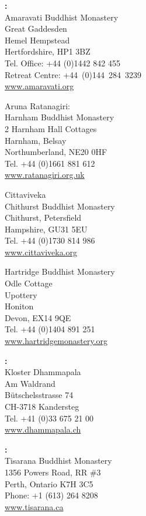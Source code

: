 {\raggedright

\textbf{\MakeUppercase{\xUnitedKingdom}:}\\
Amaravati Buddhist Monastery\\
Great Gaddesden\\
Hemel Hempstead\\
Hertfordshire, HP1 3BZ\\
Tel. Office: +44 (0)1442 842 455\\
Retreat Centre: \mbox{+44 (0)144 284 3239}\\
\href{http://www.amaravati.org}{www.amaravati.org}

Aruna Ratanagiri:\\
Harnham Buddhist Monastery\\
2 Harnham Hall Cottages\\
Harnham, Belsay\\
Northumberland, NE20 0HF\\
Tel. +44 (0)1661 881 612\\
\href{http://www.ratanagiri.org.uk}{www.ratanagiri.org.uk}

Cittaviveka\\
Chithurst Buddhist Monastery\\
Chithurst, Petersfield\\
Hampshire, GU31 5EU\\
Tel. +44 (0)1730 814 986\\
\href{http://www.cittaviveka.org}{www.cittaviveka.org}

Hartridge Buddhist Monastery\\
Odle Cottage\\
Upottery\\
Honiton\\
Devon, EX14 9QE\\
Tel. +44 (0)1404 891 251\\
\href{http://www.hartridgemonastery.org}{www.hartridgemonastery.org}

\vfill

\textbf{\MakeUppercase{\xSwitzerland}:} \\
Kloster Dhammapala\\
Am Waldrand\\
Bütschelsstrasse 74\\
CH-3718 Kandersteg\\
Tel. +41 (0)33 675 21 00\\
\href{http://www.dhammapala.ch}{www.dhammapala.ch}

\vfill

\textbf{\MakeUppercase{\xCanada}:} \\
Tisarana Buddhist Monastery\\
1356 Powers Road, RR \#3\\
Perth, Ontario K7H 3C5\\
Phone: +1 (613) 264 8208\\
\href{http://www.tisarana.ca}{www.tisarana.ca}

}

